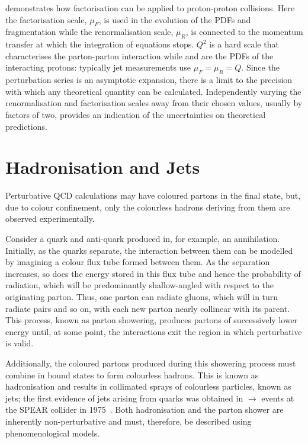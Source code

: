  demonstrates how \QCD factorisation can be applied to proton-proton collisions.
Here the factorisation scale, $\mu_F$, is used in the evolution of the PDFs and fragmentation while the renormalisation scale, $\mu_R$, is connected to the momentum transfer at which the integration of \QCD equations stops.
$Q^2$ is a hard scale that characterises the parton-parton interaction while  and  are the PDFs of the interacting protons: typically jet measurements use $\mu_F = \mu_R = Q$.
Since the perturbation series is an asymptotic expansion, there is a limit to the precision with which any theoretical quantity can be calculated.
Independently varying the renormalisation and factorisation scales away from their chosen values, usually by factors of two, provides an indication of the
uncertainties on theoretical predictions.

\section{Hadronisation and Jets}
Perturbative QCD calculations may have coloured partons in the final state, but, due to colour confinement, only the colourless hadrons deriving from them are observed experimentally.

Consider a quark and anti-quark produced in, for example, an \Pelectron\Ppositron annihilation.
Initially, as the quarks separate, the interaction between them can be modelled by imagining a colour flux tube formed between them.
As the separation increases, so does the energy stored in this flux tube and hence the probability of \QCD radiation, which will be predominantly shallow-angled with respect to the originating parton.
Thus, one parton can radiate gluons, which will in turn radiate \qqbar pairs and so on, with each new parton nearly collinear with its parent.
This process, known as parton showering, produces partons of successively lower energy until, at some point, the interactions exit the region in which perturbative \QCD is valid.

Additionally, the coloured partons produced during this showering process must combine in bound states to form colourless hadrons.
This is known as hadronisation and results in collimated sprays of colourless particles, known as jets; the first evidence of jets arising from quarks was obtained in \Ppositron\Pelectron $\rightarrow$ \qqbar events at the SPEAR collider in 1975~\cite{Hanson:1975:jetstructure}.
Both hadronisation and the parton shower are inherently non-perturbative and must, therefore, be described using phenomenological models.


